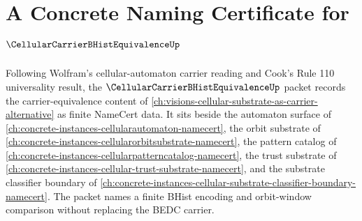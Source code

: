 \chapter{A Concrete Naming Certificate for $\CellularCarrierBHistEquivalenceUp$}
\label{ch:concrete-instances-cellular-carrier-bhist-equivalence-namecert}

Following Wolfram's cellular-automaton carrier reading and Cook's Rule 110 universality result, the $\CellularCarrierBHistEquivalenceUp$ packet records the carrier-equivalence content of \autoref{ch:visions-cellular-substrate-as-carrier-alternative} as finite NameCert data. It sits beside the automaton surface of \autoref{ch:concrete-instances-cellularautomaton-namecert}, the orbit substrate of \autoref{ch:concrete-instances-cellularorbitsubstrate-namecert}, the pattern catalog of \autoref{ch:concrete-instances-cellularpatterncatalog-namecert}, the trust substrate of \autoref{ch:concrete-instances-cellular-trust-substrate-namecert}, and the substrate classifier boundary of \autoref{ch:concrete-instances-cellular-substrate-classifier-boundary-namecert}. The packet names a finite BHist encoding and orbit-window comparison without replacing the BEDC carrier.

